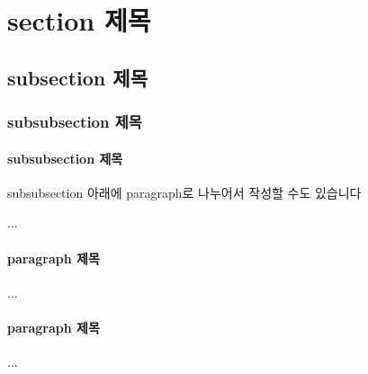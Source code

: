 \section{section 제목}

\subsection{subsection 제목}

\subsubsection{subsubsection 제목}

\paragraph{subsubsection 제목}

subsubsection 아래에 paragraph로 나누어서 작성할 수도 있습니다

...

\paragraph{paragraph 제목}

...

\paragraph{paragraph 제목}

...